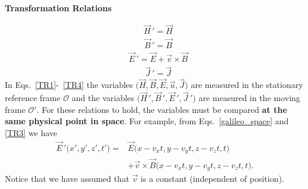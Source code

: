 \documentclass[12pt,a4paper,oneside]{book}
\begin{document}
\begin{onehalfspace}
\bigskip \ \newline	\centerline{\textbf{Transformation Relations}}
\begin{equation}\label{TR1}
	\begin{aligned}
		&\vec{H}\,'=\vec{H}
	\end{aligned}
\end{equation} 
\begin{equation}\label{TR2}
	\begin{aligned}
		&\vec{B}\,'=\vec{B}
	\end{aligned}
\end{equation} 
\begin{equation}\label{TR3}
	\begin{aligned}
		&\vec{E}\,'=\vec{E}+\vec{v}\times\vec{B}
	\end{aligned}
\end{equation} 
\begin{equation}\label{TR4}
	\begin{aligned}
		&\vec{J}\,'=\vec{J}
	\end{aligned}
\end{equation} 
In Eqs.~\eqref{TR1}-~\ref{TR4} the variables $\big(\vec{H},\vec{B},\vec{E},\vec{u},\vec{J}\big)$ are measured in the stationary reference frame $\mathcal{O}$ and the variables $\big(\vec{H}\,',\vec{B}\,',\vec{E}\,',\vec{J}\,'\big)$ are measured in the moving frame $\mathcal{O}'$. For these relations to hold, the variables must be compared \textbf{at the same physical point in space}. For example, from Eqs.~\eqref{galileo_space} and \ref{TR3} we have
\begin{equation*}
	\begin{aligned}
		\vec{E}\,'\big(x',y',z',t'\big)= & \vec{E}\big(x-v_xt,y-v_yt,z-v_zt,t\big) \\[8pt]
		&+ \vec{v}\times\vec{B}\big(x-v_xt,y-v_yt,z-v_zt,t\big).
	\end{aligned}
\end{equation*} 
Notice that we have assumed that $\vec{v}$ is a constant (independent of position). 


\end{onehalfspace}
\end{document}
